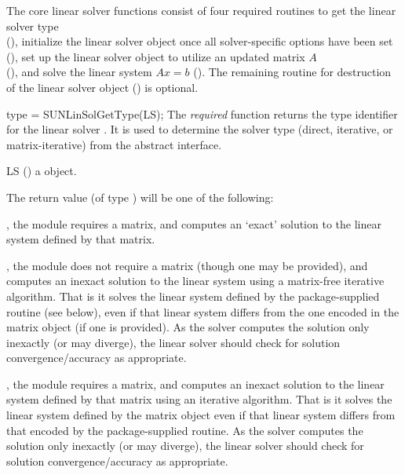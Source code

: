 The core linear solver functions consist of four required routines to get
the linear solver type \\ \noindent (), initialize
the linear solver object once all solver-specific options have been
set (), set up the linear solver object
to utilize an updated matrix $A$ \\ \noindent (),
and solve the linear system $Ax=b$ ().
The remaining routine for destruction of the linear solver object
() is optional.

{
  type = SUNLinSolGetType(LS);
}
{
  The \textit{required} function  returns the
  type identifier for the linear solver . It is used to
  determine the solver type (direct, iterative, or matrix-iterative) from
  the abstract  interface.
}
{
  \begin{args}[LS]
  \item[LS] ()
    a {\sunlinsol} object.
  \end{args}
}
{
  The return value  (of type ) will be one of the
  following:
  \begin{args}
  \item[\Id{SUNLINEARSOLVER\_DIRECT}]
    , the {\sunlinsol} module requires a matrix, and computes an
    `exact' solution to the linear system defined by that matrix.
  \item[\Id{SUNLINEARSOLVER\_ITERATIVE}]
    , the {\sunlinsol} module does not require a matrix (though one may be
    provided), and computes an inexact solution to the linear system using a
    matrix-free iterative algorithm. That is it solves the linear
    system defined by the package-supplied  routine
    (see \newline
     below), even if that linear system differs from
    the one encoded in the matrix object (if one is provided). As the solver
    computes the solution only inexactly (or may diverge), the linear solver
    should check for solution convergence/accuracy as appropriate.
  \item[\Id{SUNLINEARSOLVER\_MATRIX\_ITERATIVE}]
    , the {\sunlinsol} module requires a matrix, and computes an inexact
    solution to the linear system defined by that matrix using an iterative
    algorithm. That is it solves the linear system defined by the matrix object
    even if that linear system differs from that encoded by the package-supplied
     routine. As the solver computes the solution only inexactly (or
    may diverge), the linear solver should check for solution
    convergence/accuracy as appropriate.
  \end{args}
}
